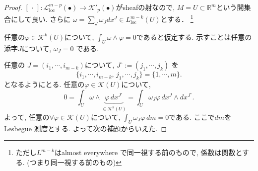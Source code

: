\begin{proof}
 \([\,\cdot\,]: \mathcal{L}^{m-p}_{\mathrm{loc}}(\bullet) \to \mathcal{K}'_p(\bullet)\)がsheafの射なので,  \(M = U \subset \mathbb{R}^m\)という開集合にして良い. 
さらに \(\omega = \sum_J \omega_J dx^J \in L^{m-k}_{\mathrm{loc}}(U)\)とする．
\footnote{ただし$ L^{m-k}$はalmost everywhere で同一視する前のもので, 係数は関数とする. (つまり同一視する前のもの)}

任意の$\varphi \in \mathcal{K}^k(U)$について, \(\int_U \omega \wedge \varphi = 0\)であると仮定する. 
示すことは任意の添字$J$について,  \(\omega_J = 0\) である. 

任意の \(J=(i_1,\cdots,i_{m-k})\)について, 
 \(J^\circ := (j_1,\cdots,j_k)\) を
\[
\{i_1,\cdots,i_{m-k},\, j_1,\cdots,j_k\}=\{1,\cdots,m\}.
\]
となるようにとる. 任意の\(\varphi \in \mathcal{K}(U)\)について, 
\[
0=
\int_U \omega \wedge \underbrace{\varphi\, dx^{J^\circ}}_{\in \mathcal{K}^k(U)}
   = \int_U \omega_J \varphi\, dx^J \wedge dx^{J^\circ}.
\]
よって, 任意の\(\forall \varphi \in \mathcal{K}(U)\)について, 
\(\int_U \omega_J \varphi\, dm = 0\)である. ここで$dm$をLesbegue 測度とする. 
よって次の補題からいえた. 
\end{proof}

